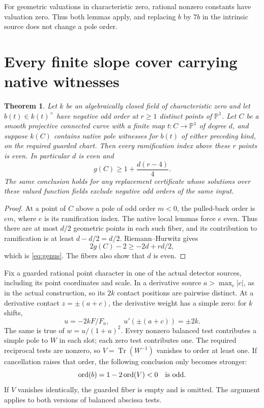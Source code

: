 \documentclass[11pt,a4paper]{article}
\newtheorem{theorem}{Theorem}[section]
\newcommand{\Tr}{\operatorname{Tr}}\newcommand{\Nm}{\operatorname{N}}
\newcommand{\ord}{\operatorname{ord}}\newcommand{\PP}{\mathbb P}
\begin{document}
For geometric valuations in characteristic zero, rational nonzero
constants have valuation zero. Thus both lemmas apply, and replacing
$b$ by $7b$ in the intrinsic source does not change a pole order.

\section{Every finite slope cover carrying native witnesses}

\begin{theorem}\label{thm:cover}
Let $k$ be an algebraically closed field of characteristic zero and
let $b(t)\in k(t)^\times$ have negative odd order at $r\ge1$ distinct
points of $\PP^1$. Let $C$ be a smooth projective connected curve
with a finite map $t:C\to\PP^1$ of degree $d$, and suppose
$k(C)$ contains native pole witnesses for $b(t)$ of either preceding
kind, on the required guarded chart. Then every ramification index
above these $r$ points is even. In particular $d$ is even and
\begin{equation}\label{eq:genus}
                         g(C)\ge1+\frac{d(r-4)}4.
\end{equation}
The same conclusion holds for any replacement certificate whose
solutions over these valued function fields exclude negative odd
orders of the same input.
\end{theorem}
\begin{proof}
At a point of $C$ above a pole of odd order $m<0$, the pulled-back
order is $em$, where $e$ is its ramification index. The native local
lemmas force $e$ even. Thus there are at most $d/2$ geometric points
in each such fiber, and its contribution to ramification is at least
$d-d/2=d/2$. Riemann--Hurwitz \cite{Stacks} gives
\[
                      2g(C)-2\ge-2d+rd/2,
\]
which is \eqref{eq:genus}. The fibers also show that $d$ is even.
\end{proof}

Fix a guarded rational point character in one of the actual detector
sources, including its point coordinates and scale. In a derivative
source $a>\max_c|c|$, as in the actual construction, so its $2k$
contact positions are pairwise distinct. At a derivative contact
$z=\pm(a+c)$, the derivative
weight has a simple zero: for $k$ shifts,
\[
 u=-2kF/F_a,\qquad u'(\pm(a+c))=\pm2k.
\]
The same is true of $w=u/(1+u)^2$. Every nonzero balanced test
contributes a simple pole to $W$ in each slot; each zero test
contributes one. The required reciprocal tests are nonzero, so
$V=\Tr(W^{-1})$ vanishes to order at least one. If cancellation
raises that order, the following conclusion only becomes stronger:
\[
                  \ord(b)=1-2\ord(V)<0\quad\hbox{is odd}.
\]
If $V$ vanishes identically, the guarded fiber is empty and is omitted.
The argument applies to both versions of balanced abscissa tests.
\end{document}
